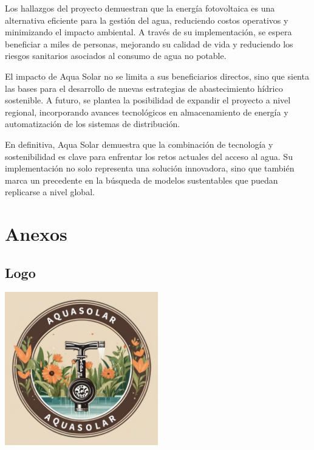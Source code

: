 \documentclass[12pt]{article}
\begin{document}
Los hallazgos del proyecto demuestran que la energía fotovoltaica es una alternativa eficiente para la gestión del agua, reduciendo costos operativos y minimizando el impacto ambiental. A través de su implementación, se espera beneficiar a miles de personas, mejorando su calidad de vida y reduciendo los riesgos sanitarios asociados al consumo de agua no potable.

El impacto de Aqua Solar no se limita a sus beneficiarios directos, sino que sienta las bases para el desarrollo de nuevas estrategias de abastecimiento hídrico sostenible. A futuro, se plantea la posibilidad de expandir el proyecto a nivel regional, incorporando avances tecnológicos en almacenamiento de energía y automatización de los sistemas de distribución.

En definitiva, Aqua Solar demuestra que la combinación de tecnología y sostenibilidad es clave para enfrentar los retos actuales del acceso al agua. Su implementación no solo representa una solución innovadora, sino que también marca un precedente en la búsqueda de modelos sustentables que puedan replicarse a nivel global.

\newpage
\nocite{*}
\newpage
\section{Anexos}

\subsection*{Logo}
\begin{center}
      \includegraphics[width=0.5\textwidth]{imagenes/logo.png}
\end{center}
\end{document}
